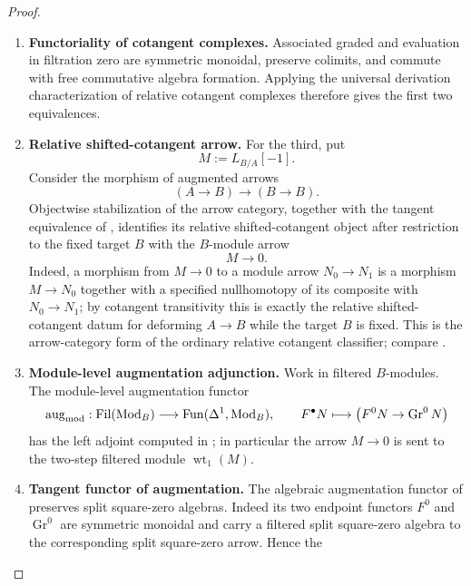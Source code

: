 \begin{proof}
\leavevmode
\begin{enumerate}[label=\textup{(\arabic*)}]
    \item \textbf{Functoriality of cotangent complexes.}
    Associated graded and evaluation in filtration zero are symmetric monoidal,
    preserve colimits, and commute with free commutative algebra formation.
    Applying the universal derivation characterization of relative cotangent
    complexes therefore gives the first two equivalences.
    \item \textbf{Relative shifted-cotangent arrow.}
    For the third, put
    \[
        M:=L_{B/A}[-1].
    \]
    Consider the morphism of augmented arrows
    \[
        (A\to B)\longrightarrow(B\to B).
    \]
    Objectwise stabilization of the arrow category, together with the tangent
    equivalence of , identifies its relative
    shifted-cotangent object after restriction to the fixed target \(B\) with the
    \(B\)-module arrow
    \[
        M\longrightarrow0.
    \]
    Indeed, a morphism from \(M\to0\) to a module arrow
    \(N_0\to N_1\) is a morphism \(M\to N_0\) together with a specified
    nullhomotopy of its composite with \(N_0\to N_1\); by cotangent transitivity
    this is exactly the relative shifted-cotangent datum for deforming \(A\to B\) while
    the target \(B\) is fixed. This is the arrow-category form of the ordinary
    relative cotangent classifier; compare
    \cite[Definition~2.9 and Remark~2.10]{BrantnerMagidsonNuiten}.
    \item \textbf{Module-level augmentation adjunction.}
    Work in filtered \(B\)-modules. The module-level augmentation functor
    \[
        \operatorname{aug}_{\mathrm{mod}}:
        \operatorname{Fil}(\operatorname{Mod}_B)
        \longrightarrow
        \operatorname{Fun}(\Delta^1,\operatorname{Mod}_B),
        \qquad
        F^\bullet N\longmapsto
        \bigl(F^0N\to\operatorname{Gr}^0N\bigr)
    \]
    has the left adjoint computed in
    ; in particular the arrow
    \(M\to0\) is sent to the two-step filtered module \(\operatorname{wt}_1(M)\).
    \item \textbf{Tangent functor of augmentation.}
    The algebraic augmentation functor of
     preserves split square-zero
    algebras. Indeed its two endpoint functors \(F^0\) and
    \(\operatorname{Gr}^0\) are symmetric monoidal and carry a filtered split
    square-zero algebra to the corresponding split square-zero arrow. Hence the

\end{enumerate}
\end{proof}
